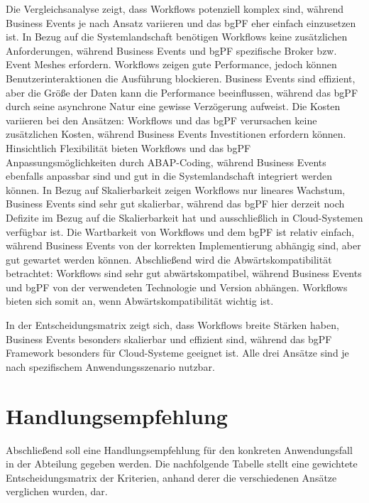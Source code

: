 Die Vergleichsanalyse zeigt, dass Workflows potenziell komplex sind, während Business Events je nach Ansatz variieren und das bgPF eher einfach einzusetzen ist. In Bezug auf die Systemlandschaft benötigen Workflows keine zusätzlichen Anforderungen, während Business Events und bgPF spezifische Broker bzw. Event Meshes erfordern. Workflows zeigen gute Performance, jedoch können Benutzerinteraktionen die Ausführung blockieren. Business Events sind effizient, aber die Grö{\ss}e der Daten kann die Performance beeinflussen, während das bgPF durch seine asynchrone Natur eine gewisse Verzögerung aufweist. Die Kosten variieren bei den Ansätzen: Workflows und das bgPF verursachen keine zusätzlichen Kosten, während Business Events Investitionen erfordern können. Hinsichtlich Flexibilität bieten Workflows und das bgPF Anpassungsmöglichkeiten durch ABAP-Coding, während Business Events ebenfalls anpassbar sind und gut in die Systemlandschaft integriert werden können. In Bezug auf Skalierbarkeit zeigen Workflows nur lineares Wachstum, Business Events sind sehr gut skalierbar, während das bgPF hier derzeit noch Defizite im Bezug auf die Skalierbarkeit hat und ausschlie{\ss}lich in Cloud-Systemen verfügbar ist. Die Wartbarkeit von Workflows und dem bgPF ist relativ einfach, während Business Events von der korrekten Implementierung abhängig sind, aber gut gewartet werden können. Abschlie{\ss}end wird die Abwärtskompatibilität betrachtet: Workflows sind sehr gut abwärtskompatibel, während Business Events und bgPF von der verwendeten Technologie und Version abhängen. Workflows bieten sich somit an, wenn Abwärtskompatibilität wichtig ist.

In der Entscheidungsmatrix zeigt sich, dass Workflows breite Stärken haben, Business Events besonders skalierbar und effizient sind, während das bgPF Framework besonders für Cloud-Systeme geeignet ist. Alle drei Ansätze sind je nach spezifischem Anwendungsszenario nutzbar.

\section{Handlungsempfehlung}

Abschlie{\ss}end soll eine Handlungsempfehlung für den konkreten Anwendungsfall in der Abteilung gegeben werden. Die nachfolgende Tabelle stellt eine gewichtete Entscheidungsmatrix der Kriterien, anhand derer die verschiedenen Ansätze verglichen wurden, dar.


